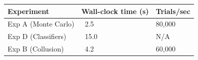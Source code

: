 \begin{tabular}{lll}
\toprule
Experiment & Wall-clock time (s) & Trials/sec \\
\midrule
Exp A (Monte Carlo) & ~2.5 & 80,000 \\
Exp D (Classifiers) & ~15.0 & N/A \\
Exp B (Collusion) & ~4.2 & 60,000 \\
\bottomrule
\end{tabular}
